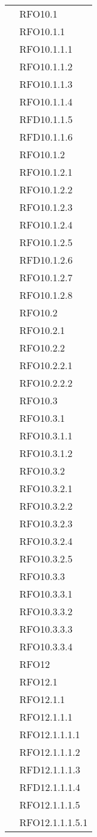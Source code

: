 \begin{longtable}{ p{12cm} | p{4cm} }
& RFO10.1 \\
& RFO10.1.1 \\
& RFO10.1.1.1 \\
& RFO10.1.1.2 \\
& RFO10.1.1.3 \\
& RFO10.1.1.4 \\
& RFD10.1.1.5 \\
& RFD10.1.1.6 \\
& RFO10.1.2 \\
& RFO10.1.2.1 \\
& RFO10.1.2.2 \\
& RFO10.1.2.3 \\
& RFO10.1.2.4 \\
& RFO10.1.2.5 \\
& RFD10.1.2.6 \\
& RFO10.1.2.7 \\
& RFO10.1.2.8 \\
& RFO10.2 \\
& RFO10.2.1 \\
& RFO10.2.2 \\
& RFO10.2.2.1 \\
& RFO10.2.2.2 \\
& RFO10.3 \\
& RFO10.3.1 \\
& RFO10.3.1.1 \\
& RFO10.3.1.2 \\
& RFO10.3.2 \\
& RFO10.3.2.1 \\
& RFO10.3.2.2 \\
& RFO10.3.2.3 \\
& RFO10.3.2.4 \\
& RFO10.3.2.5 \\
& RFO10.3.3 \\
& RFO10.3.3.1 \\
& RFO10.3.3.2 \\
& RFO10.3.3.3 \\
& RFO10.3.3.4 \\
& RFO12 \\
& RFO12.1 \\
& RFO12.1.1 \\
& RFO12.1.1.1 \\
& RFO12.1.1.1.1 \\
& RFO12.1.1.1.2 \\
& RFD12.1.1.1.3 \\
& RFD12.1.1.1.4 \\
& RFO12.1.1.1.5 \\
& RFO12.1.1.1.5.1 \\

\end{longtable}

